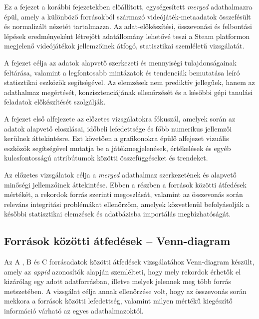 
Ez a fejezet a korábbi fejezetekben előállított, egységesített \textit{merged} adathalmazra épül, amely a különböző forrásokból származó videójáték-metaadatok összefésült és normalizált nézetét tartalmazza. Az adat-előkészítési, összevonási és felbontási lépések eredményeként létrejött adatállomány lehetővé teszi a Steam \cite{steam} platformon megjelenő videójátékok jellemzőinek átfogó, statisztikai szemléletű vizsgálatát.

A fejezet célja az adatok alapvető szerkezeti és mennyiségi tulajdonságainak feltárása, valamint a legfontosabb mintázatok és tendenciák bemutatása leíró statisztikai eszközök segítségével. Az elemzések nem prediktív jellegűek, hanem az adathalmaz megértését, konzisztenciájának ellenőrzését és a későbbi gépi tanulási feladatok előkészítését szolgálják.

A fejezet első alfejezete az előzetes vizsgálatokra fókuszál, amelyek során az adatok alapvető eloszlásai, időbeli lefedettsége és főbb numerikus jellemzői kerülnek áttekintésre. Ezt követően a grafikonokra épülő alfejezet vizuális eszközök segítségével mutatja be a játékmegjelenések, értékelések és egyéb kulcsfontosságú attribútumok közötti összefüggéseket és trendeket.


Az előzetes vizsgálatok célja a \textit{merged} adathalmaz szerkezetének és
alapvető minőségi jellemzőinek áttekintése. Ebben a részben a források közötti
átfedések mértékét, a rekordok forrás szerinti megoszlását, valamint az összevonás
során releváns integritási problémákat ellenőrzöm, amelyek közvetlenül befolyásolják
a későbbi statisztikai elemzések és adatbázisba importálás megbízhatóságát.

\subsection{Források közötti átfedések -- Venn-diagram}

Az A \cite{a}, B \cite{b} és C \cite{c} forrásadatok közötti átfedések vizsgálatához Venn-diagram készült, amely az \textit{appid} azonosítók alapján szemlélteti, hogy mely rekordok érhetők el kizárólag egy adott adatforrásban, illetve melyek jelennek meg több forrás metszetében. A vizsgálat célja annak ellenőrzése volt, hogy az összevonás során mekkora a források közötti lefedettség, valamint milyen mértékű kiegészítő információ várható az egyes adathalmazoktól.

